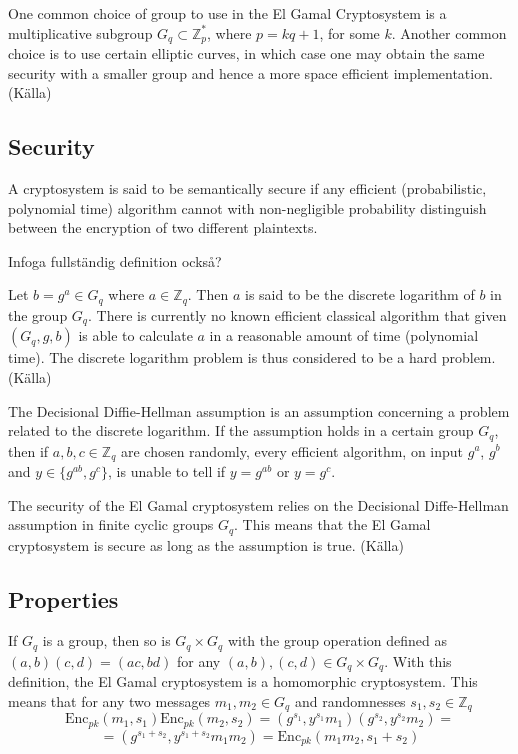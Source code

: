 One common choice of group to use in the El Gamal Cryptosystem is a
multiplicative subgroup $G_q \subset \mathbb{Z}_p^*$, where $p = kq +
1$, for some $k$. Another common choice is to use certain elliptic
curves, in which case one may obtain the same security with a smaller
group and hence a more space efficient implementation. (Källa)

\subsection{Security}
A cryptosystem is said to be semantically secure if any efficient
(probabilistic, polynomial time) algorithm cannot with non-negligible
probability distinguish between the encryption of two different
plaintexts.

Infoga fullständig definition också?

Let $b = g^a \in G_q$ where $a \in \mathbb{Z}_q$. Then $a$ is said to
be the discrete logarithm of $b$ in the group $G_q$. There is
currently no known efficient classical algorithm that given $(G_q, g,
b)$ is able to calculate $a$ in a reasonable amount of time
(polynomial time). The discrete logarithm problem is thus considered
to be a hard problem. (Källa)

The Decisional Diffie-Hellman assumption is an assumption concerning a
problem related to the discrete logarithm. If the assumption holds in
a certain group $G_q$, then if $a,b,c \in \mathbb{Z}_q$ are chosen
randomly, every efficient algorithm, on input $g^a$, $g^b$ and $y \in
\{g^{ab}, g^c\}$, is unable to tell if $y = g^{ab}$ or $y = g^c$.

The security of the El Gamal cryptosystem relies on the Decisional
Diffe-Hellman assumption in finite cyclic groups $G_q$. This means
that the El Gamal cryptosystem is secure as long as the assumption is
true. (Källa)

\subsection{Properties}
If $G_q$ is a group, then so is $G_q \times G_q$ with the group
operation defined as $(a,b)(c,d) = (a c, b d)$
for any $(a,b),(c,d) \in G_q \times G_q$. With this definition, the El Gamal
cryptosystem is a homomorphic cryptosystem. This means that for any
two messages $m_1, m_2 \in G_q$ and randomnesses $s_1, s_2 \in
\mathbb{Z}_q$
$$
 \mathrm{Enc}_{pk}(m_1, s_1)\mathrm{Enc}_{pk}(m_2, s_2) =
(g^{s_1}, y^{s_1}m_1)(g^{s_2},y^{s_2}m_2) =
$$
$$
= (g^{s_1 + s_2}, y^{s_1 + s_2}m_1m_2) = \mathrm{Enc}_{pk}(m_1m_2, s_1 + s_2)
$$

